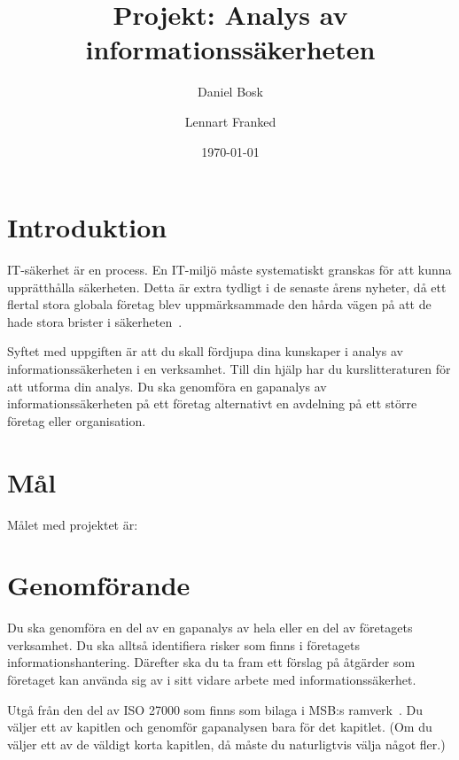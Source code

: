 \documentclass[a4paper]{article}
\begin{document}
\title{Projekt: Analys av informationssäkerheten}
\author{Daniel Bosk}
\author{Lennart Franked}
\date{\today}

\maketitle

\section{Introduktion}

IT-säkerhet är en process.
En IT-miljö måste systematiskt granskas för att kunna upprätthålla säkerheten.
Detta är extra tydligt i de senaste årens nyheter, då ett flertal stora globala 
företag blev uppmärksammade den hårda vägen på att de hade stora brister 
i säkerheten~\cite[se][]{Fisher2011rsa,Hunt2011abs,Cluley2012twp,%
  Oberheide2010bao,Cubrilovic2009rhf,%
  Jones2013targethack,Ducklin2014targethack,Zetter2014targethack%
}.

Syftet med uppgiften är att du skall fördjupa dina kunskaper i analys av 
informationssäkerheten i en verksamhet.
Till din hjälp har du kurslitteraturen för att utforma din analys.
Du ska genomföra en gapanalys av informationssäkerheten på ett företag 
alternativt en avdelning på ett större företag eller organisation.


\section{Mål}

Målet med projektet är:
\begin{itemize}
	
\end{itemize}


\section{Genomförande}
\noindent
Du ska genomföra en del av en gapanalys av hela eller en del av företagets 
verksamhet.
Du ska alltså identifiera risker som finns i företagets informationshantering.
Därefter ska du ta fram ett förslag på åtgärder som företaget kan använda sig 
av i sitt vidare arbete med informationssäkerhet.

Utgå från den del av ISO 27000 som finns som bilaga i MSB:s
ramverk~\cite{MSB2011gb}. 
Du väljer ett av kapitlen och genomför gapanalysen bara för det kapitlet. (Om
du väljer ett av de väldigt korta kapitlen, då måste du naturligtvis välja något
fler.)
\end{document}
